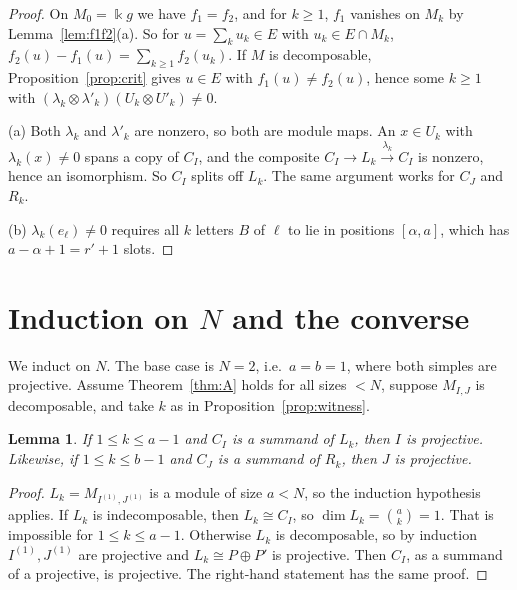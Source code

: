 \documentclass[11pt]{amsart}
\newcommand{\kk}{\Bbbk}
\theoremstyle{plain}
\newtheorem{lemma}{Lemma}[section]
\theoremstyle{definition}
\begin{document}
\begin{proof}
On $M_0=\kk g$ we have $f_1=f_2$, and for $k\ge1$, $f_1$ vanishes on $M_k$ by Lemma~\ref{lem:f1f2}(a). So for $u=\sum_ku_k\in E$ with $u_k\in E\cap M_k$, $f_2(u)-f_1(u)=\sum_{k\ge1}f_2(u_k)$. If $M$ is decomposable, Proposition~\ref{prop:crit} gives $u\in E$ with $f_1(u)\ne f_2(u)$, hence some $k\ge1$ with $(\lambda_k\otimes\lambda'_k)(U_k\otimes U'_k)\ne0$.

(a) Both $\lambda_k$ and $\lambda'_k$ are nonzero, so both are module maps. An $x\in U_k$ with $\lambda_k(x)\ne0$ spans a copy of $C_I$, and the composite $C_I\to L_k\xrightarrow{\lambda_k}C_I$ is nonzero, hence an isomorphism. So $C_I$ splits off $L_k$. The same argument works for $C_J$ and $R_k$.

(b) $\lambda_k(e_\ell)\ne0$ requires all $k$ letters $B$ of $\ell$ to lie in positions $[\alpha,a]$, which has $a-\alpha+1=r'+1$ slots.
\end{proof}

\section{Induction on \texorpdfstring{$N$}{N} and the converse}

We induct on $N$. The base case is $N=2$, i.e.\ $a=b=1$, where both simples are projective. Assume Theorem~\ref{thm:A} holds for all sizes $<N$, suppose $M_{I,J}$ is decomposable, and take $k$ as in Proposition~\ref{prop:witness}.

\begin{lemma}\label{lem:I-ind}
If $1\le k\le a-1$ and $C_I$ is a summand of $L_k$, then $I$ is projective. Likewise, if $1\le k\le b-1$ and $C_J$ is a summand of $R_k$, then $J$ is projective.
\end{lemma}

\begin{proof}
$L_k=M_{I^{(1)},J^{(1)}}$ is a module of size $a<N$, so the induction hypothesis applies. If $L_k$ is indecomposable, then $L_k\cong C_I$, so $\dim L_k=\binom ak=1$. That is impossible for $1\le k\le a-1$. Otherwise $L_k$ is decomposable, so by induction $I^{(1)},J^{(1)}$ are projective and $L_k\cong P\oplus P'$ is projective. Then $C_I$, as a summand of a projective, is projective. The right-hand statement has the same proof.
\end{proof}
\end{document}

